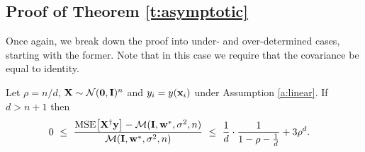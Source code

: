 \documentclass[11pt]{article}
\begin{document}
\subsection{Proof of Theorem \ref{t:asymptotic}}
Once again, we break down the proof into under- and
over-determined cases, starting with the former. Note that in this
case we require that the covariance be equal to identity.
\begin{lemma}\label{l:asymptotic-under}
Let $\rho=n/d$, $\mathbf X\sim \mathcal{N}(\mathbf 0,\mathbf I)^n$ and $y_i=y(\mathbf x_i)$ under Assumption
  \ref{a:linear}. If $d>n+1$ then
  \begin{align*}
    &0\ \leq\ \frac{{\mathrm{MSE}\big[\mathbf X^\dagger\mathbf y\big]}-\mathcal M(\mathbf I,
\mathbf w^*,\sigma^2,n)}{\mathcal M(\mathbf I,\mathbf w^*,\sigma^2,n)}\ \leq\
\frac1d\cdot \frac{1}{1-\rho-\frac1d} + 3\rho^d.
  \end{align*}
\end{lemma}
\end{document}
